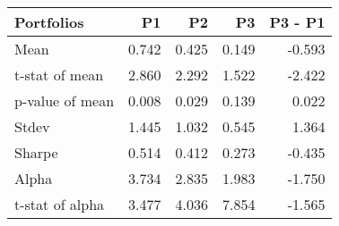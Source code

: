 \begin{tabular}{lrrrr}
\toprule
Portfolios & P1 & P2 & P3 & P3 - P1 \\
\midrule
Mean & 0.742 & 0.425 & 0.149 & -0.593 \\
t-stat of mean & 2.860 & 2.292 & 1.522 & -2.422 \\
p-value of mean & 0.008 & 0.029 & 0.139 & 0.022 \\
Stdev & 1.445 & 1.032 & 0.545 & 1.364 \\
Sharpe & 0.514 & 0.412 & 0.273 & -0.435 \\
Alpha & 3.734 & 2.835 & 1.983 & -1.750 \\
t-stat of alpha & 3.477 & 4.036 & 7.854 & -1.565 \\
\bottomrule
\end{tabular}

